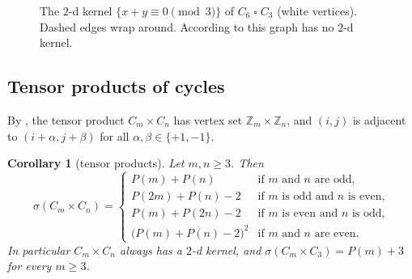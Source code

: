 \documentclass[11pt]{article}
\theoremstyle{plain}
\newtheorem{corollary}[corollary]{Corollary}
\theoremstyle{definition}
\theoremstyle{remark}
\newcommand{\Z}{\mathbb{Z}}
\newcommand{\T}{\mathbin{\square}}
\newcommand{\Per}{P}
\begin{document}
\begin{figure}[ht]
\centering
{}
\caption{The $2$-d kernel $\{x + y \equiv 0 \pmod 3\}$ of $C_6 \T C_3$ (white vertices).
Dashed edges wrap around. According to \cite[Theorem~2.5]{BW2016} this graph has no $2$-d
kernel.}
\label{fig:c6c3}
\end{figure}

\subsection{Tensor products of cycles}

By , the tensor product $C_m \times C_n$ has vertex set
$\Z_m \times \Z_n$, and $(i,j)$ is adjacent to $(i + \alpha, j + \beta)$ for all
$\alpha, \beta \in \{+1,-1\}$.

\begin{corollary}[tensor products]\label{cor:tensor}
Let $m, n \ge 3$. Then
\[
\sigma(C_m \times C_n) =
\begin{cases}
\Per(m) + \Per(n) & \text{if $m$ and $n$ are odd,}\\
\Per(2m) + \Per(n) - 2 & \text{if $m$ is odd and $n$ is even,}\\
\Per(m) + \Per(2n) - 2 & \text{if $m$ is even and $n$ is odd,}\\
\bigl(\Per(m) + \Per(n) - 2\bigr)^2 & \text{if $m$ and $n$ are even.}
\end{cases}
\]
In particular $C_m \times C_n$ always has a $2$-d kernel, and
$\sigma(C_m \times C_3) = \Per(m) + 3$ for every $m \ge 3$.
\end{corollary}
\end{document}

